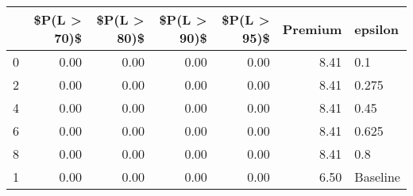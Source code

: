 \begin{tabular}{lrrrrrl}
\toprule
{} &  \$P(L > 70)\$ &  \$P(L > 80)\$ &  \$P(L > 90)\$ &  \$P(L > 95)\$ &  Premium &   epsilon \\
\midrule
0 &         0.00 &         0.00 &         0.00 &         0.00 &     8.41 &       0.1 \\
2 &         0.00 &         0.00 &         0.00 &         0.00 &     8.41 &     0.275 \\
4 &         0.00 &         0.00 &         0.00 &         0.00 &     8.41 &      0.45 \\
6 &         0.00 &         0.00 &         0.00 &         0.00 &     8.41 &     0.625 \\
8 &         0.00 &         0.00 &         0.00 &         0.00 &     8.41 &       0.8 \\
1 &         0.00 &         0.00 &         0.00 &         0.00 &     6.50 &  Baseline \\
\bottomrule
\end{tabular}
